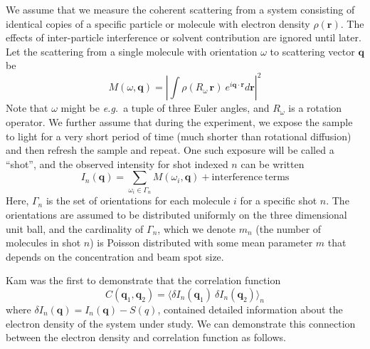 \documentclass[aps,prl,preprint,groupedaddress]{revtex4-1}
\def\*#1{\mathbf{#1}}
\begin{document}
We assume that we measure the coherent scattering from a system consisting of identical copies of a specific particle or molecule with electron density $\rho(\*{r})$. The effects of inter-particle interference or solvent contribution are ignored until later. Let the scattering from a single molecule with orientation $\omega$ to scattering vector $\*{q}$ be
\begin{equation} \label{molecular-scattering}
M( \omega, \*{q} ) = \left| \int \rho(R_\omega \, \*{r}) \> e^{ i \*{q} \cdot \*{r} } d\*r \right|^2
\end{equation}
Note that $\omega$ might be \textit{e.g.}~a tuple of three Euler angles, and $R_\omega$ is a rotation operator. We further assume that during the experiment, we expose the sample to light for a very short period of time (much shorter than rotational diffusion) and then refresh the sample and repeat. One such exposure will be called a ``shot'', and the observed intensity for shot indexed $n$ can be written
\[
I_n ( \*q ) = \sum_{\omega_i \in \Gamma_n} M( \omega_i, \*{q} ) + \mathrm{interference\ terms}
\]
Here, $\Gamma_n$ is the set of orientations for each molecule $i$ for a specific shot $n$. The orientations are assumed to be distributed uniformly on the three dimensional unit ball, and the cardinality of $\Gamma_n$, which we denote $m_n$ (the number of molecules in shot $n$) is Poisson distributed with some mean parameter $m$ that depends on the concentration and beam spot size.

Kam was the first to demonstrate that the correlation function
\begin{equation}\label{correlation}
C( \*q_1, \*q_2 ) = \big\langle \delta I_n ( \*q_1 ) \> \delta I_n ( \*q_2 ) \big\rangle_n
\end{equation}
where $\delta I_n ( \*q ) = I_n ( \*q ) - S( q )$, contained detailed information about the electron density of the system under study. We can demonstrate this connection between the electron density and correlation function as follows.
\end{document}
